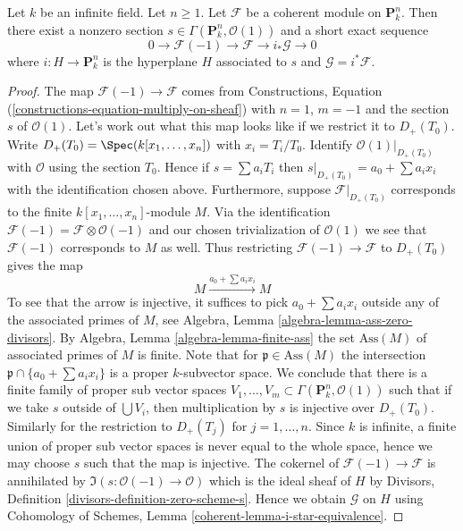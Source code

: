 \begin{lemma}
\label{lemma-exact-sequence-induction}
Let $k$ be an infinite field. Let $n \geq 1$.
Let $\mathcal{F}$ be a coherent module on $\mathbf{P}^n_k$.
Then there exist a nonzero section
$s \in \Gamma(\mathbf{P}^n_k, \mathcal{O}(1))$
and a short exact sequence
$$
0 \to \mathcal{F}(-1) \to \mathcal{F} \to i_*\mathcal{G} \to 0
$$
where $i : H \to \mathbf{P}^n_k$ is the hyperplane $H$ associated to $s$
and $\mathcal{G} = i^*\mathcal{F}$.
\end{lemma}

\begin{proof}
The map $\mathcal{F}(-1) \to \mathcal{F}$ comes from
Constructions, Equation (\ref{constructions-equation-multiply-on-sheaf})
with $n = 1$, $m = -1$ and the section $s$ of $\mathcal{O}(1)$.
Let's work out what this map looks like if we restrict it to
$D_{+}(T_0)$. Write $D_{+}(T_0) = \Spec(k[x_1, \ldots, x_n])$
with $x_i = T_i/T_0$. Identify $\mathcal{O}(1)|_{D_{+}(T_0)}$ with
$\mathcal{O}$ using the section $T_0$. Hence if
$s = \sum a_iT_i$ then $s|_{D_{+}(T_0)} = a_0 + \sum a_ix_i$
with the identification chosen above. Furthermore, suppose
$\mathcal{F}|_{D_{+}(T_0)}$ corresponds to the finite
$k[x_1, \ldots, x_n]$-module $M$. Via the identification
$\mathcal{F}(-1) = \mathcal{F} \otimes \mathcal{O}(-1)$
and our chosen trivialization of $\mathcal{O}(1)$ we see that
$\mathcal{F}(-1)$ corresponds to $M$ as well. Thus
restricting $\mathcal{F}(-1) \to \mathcal{F}$ to $D_{+}(T_0)$ gives
the map
$$
M \xrightarrow{a_0 + \sum a_ix_i} M
$$
To see that the arrow is injective, it suffices to pick
$a_0 + \sum a_ix_i$ outside any of the associated primes of $M$, see
Algebra, Lemma \ref{algebra-lemma-ass-zero-divisors}. By
Algebra, Lemma \ref{algebra-lemma-finite-ass}
the set $\text{Ass}(M)$ of associated primes of $M$ is finite.
Note that for $\mathfrak p \in \text{Ass}(M)$ the intersection
$\mathfrak p \cap \{a_0 + \sum a_i x_i\}$ is a proper $k$-subvector space.
We conclude that there is a finite family of proper sub vector spaces
$V_1, \ldots, V_m \subset \Gamma(\mathbf{P}^n_k, \mathcal{O}(1))$
such that if we take $s$ outside of $\bigcup V_i$, then multiplication
by $s$ is injective over $D_{+}(T_0)$.
Similarly for the restriction to $D_{+}(T_j)$ for $j = 1, \ldots, n$.
Since $k$ is infinite, a finite union of proper sub vector spaces
is never equal to the whole space, hence we may choose $s$ such
that the map is injective.
The cokernel of $\mathcal{F}(-1) \to \mathcal{F}$ is annihilated
by $\Im(s : \mathcal{O}(-1) \to \mathcal{O})$ which is
the ideal sheaf of $H$ by
Divisors, Definition \ref{divisors-definition-zero-scheme-s}.
Hence we obtain $\mathcal{G}$ on $H$ using
Cohomology of Schemes, Lemma \ref{coherent-lemma-i-star-equivalence}.
\end{proof}

